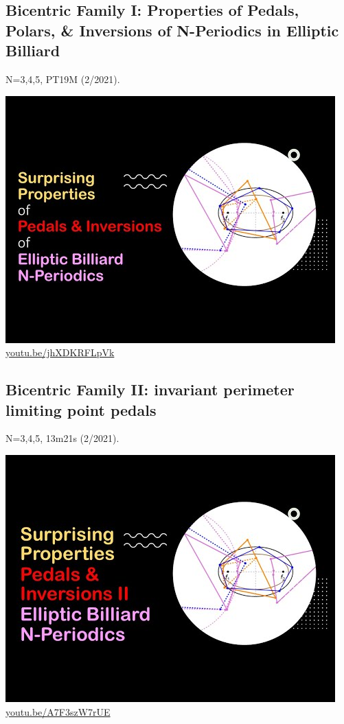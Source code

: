 \documentclass[12pt]{amsart}
\begin{document}
\subsection{Bicentric Family I: Properties of Pedals, Polars, \& Inversions of N-Periodics in Elliptic Billiard}
\label{vid:jhXDKRFLpVk}
\noindent N=3,4,5, PT19M (2/2021). 
\begin{center}\includegraphics[width=.5\textwidth]{pics/jhXDKRFLpVk.jpg} \\ 
\href{https://youtu.be/jhXDKRFLpVk}{\url{youtu.be/jhXDKRFLpVk}}\end{center}
% 

\subsection{Bicentric Family II: invariant perimeter limiting point pedals}
\label{vid:A7F3szW7rUE}
\noindent N=3,4,5, 13m21s (2/2021). 
\begin{center}\includegraphics[width=.5\textwidth]{pics/A7F3szW7rUE.jpg} \\ 
\href{https://youtu.be/A7F3szW7rUE}{\url{youtu.be/A7F3szW7rUE}}\end{center}
% 
\end{document}
